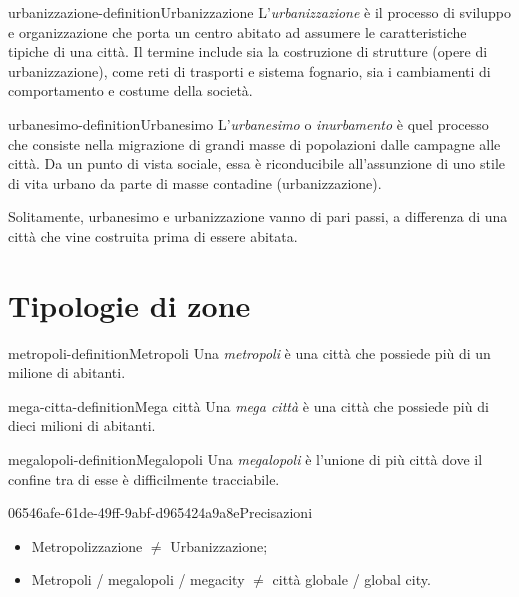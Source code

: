 \documentclass[preview]{standalone}
\begin{document}
\begin{snippetdefinition}{urbanizzazione-definition}{Urbanizzazione}
    L'\textit{urbanizzazione} è il processo di sviluppo e organizzazione
    che porta un centro abitato ad assumere le caratteristiche tipiche di una città.
    Il termine include sia la costruzione di strutture (opere di urbanizzazione),
    come reti di trasporti e sistema fognario, sia i cambiamenti di comportamento e
    costume della società. 
\end{snippetdefinition}

\begin{snippetdefinition}{urbanesimo-definition}{Urbanesimo}
    L'\textit{urbanesimo} o \textit{inurbamento} è quel processo che consiste nella migrazione
    di grandi masse di popolazioni dalle campagne alle città.
    Da un punto di vista sociale, essa è riconducibile all'assunzione di uno stile
    di vita urbano da parte di masse contadine (urbanizzazione). 
\end{snippetdefinition}

\begin{plainhtml}
    Solitamente, urbanesimo e urbanizzazione vanno di pari passi,
    a differenza di una città che vine costruita prima di essere abitata.
\end{plainhtml}

\section{Tipologie di zone}

\begin{snippetdefinition}{metropoli-definition}{Metropoli}
    Una \textit{metropoli} è una città che possiede più di un milione di abitanti.
\end{snippetdefinition}

\begin{snippetdefinition}{mega-citta-definition}{Mega città}
    Una \textit{mega città} è una città che possiede più di dieci milioni di abitanti.
\end{snippetdefinition}

\begin{snippetdefinition}{megalopoli-definition}{Megalopoli}
    Una \textit{megalopoli} è l'unione di più città dove il confine
    tra di esse è difficilmente tracciabile.
\end{snippetdefinition}


\begin{snippetnote}{06546afe-61de-49ff-9abf-d965424a9a8e}{Precisazioni}
    \begin{itemize}
        \item Metropolizzazione \(\neq\) Urbanizzazione;
        \item Metropoli / megalopoli / megacity \(\neq\) città globale / global
        city.
    \end{itemize}
\end{snippetnote}
\end{document}
